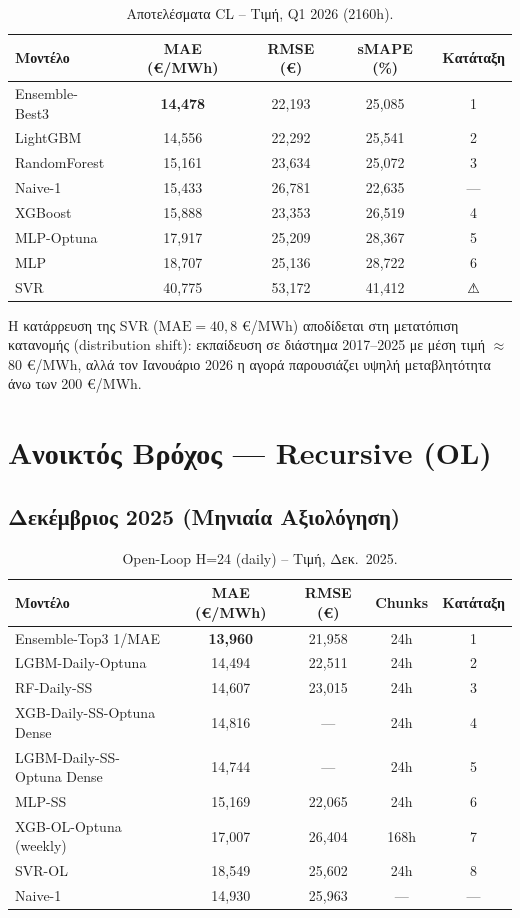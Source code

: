 \begin{table}[H]
\centering
\caption{Αποτελέσματα CL -- Τιμή, Q1 2026 (2160h).}
\label{tab:cl_price_q1}
\begin{tabular}{lcccc}
\toprule
\textbf{Μοντέλο} & \textbf{MAE (€/MWh)} & \textbf{RMSE (€)} & \textbf{sMAPE (\%)} & \textbf{Κατάταξη} \\
\midrule
Ensemble-Best3 & \textbf{14,478} & 22,193 & 25,085 & 1 \\
LightGBM & 14,556 & 22,292 & 25,541 & 2 \\
RandomForest & 15,161 & 23,634 & 25,072 & 3 \\
Naive-1 & 15,433 & 26,781 & 22,635 & --- \\
XGBoost & 15,888 & 23,353 & 26,519 & 4 \\
MLP-Optuna & 17,917 & 25,209 & 28,367 & 5 \\
MLP & 18,707 & 25,136 & 28,722 & 6 \\
SVR & 40,775 & 53,172 & 41,412 & ⚠ \\
\bottomrule
\end{tabular}
\end{table}

Η κατάρρευση της SVR ($\text{MAE}=40,8$ €/MWh) αποδίδεται στη μετατόπιση κατανομής (distribution
shift): εκπαίδευση σε διάστημα 2017--2025 με μέση τιμή $\approx$ 80 €/MWh, αλλά τον Ιανουάριο
2026 η αγορά παρουσιάζει υψηλή μεταβλητότητα άνω των 200 €/MWh.


\section{Ανοικτός Βρόχος --- Recursive (OL)}
\label{sec:ol_results}

\subsection{Δεκέμβριος 2025 (Μηνιαία Αξιολόγηση)}

\begin{table}[H]
\centering
\caption{Open-Loop H=24 (daily) -- Τιμή, Δεκ.\ 2025.}
\label{tab:ol_price_1m}
\begin{tabular}{lcccc}
\toprule
\textbf{Μοντέλο} & \textbf{MAE (€/MWh)} & \textbf{RMSE (€)} & \textbf{Chunks} & \textbf{Κατάταξη} \\
\midrule
Ensemble-Top3 1/MAE & \textbf{13,960} & 21,958 & 24h & 1 \\
LGBM-Daily-Optuna & 14,494 & 22,511 & 24h & 2 \\
RF-Daily-SS & 14,607 & 23,015 & 24h & 3 \\
XGB-Daily-SS-Optuna Dense & 14,816 & --- & 24h & 4 \\
LGBM-Daily-SS-Optuna Dense & 14,744 & --- & 24h & 5 \\
MLP-SS & 15,169 & 22,065 & 24h & 6 \\
XGB-OL-Optuna (weekly) & 17,007 & 26,404 & 168h & 7 \\
SVR-OL & 18,549 & 25,602 & 24h & 8 \\
\midrule
Naive-1 & 14,930 & 25,963 & --- & --- \\
\bottomrule
\end{tabular}
\end{table}

